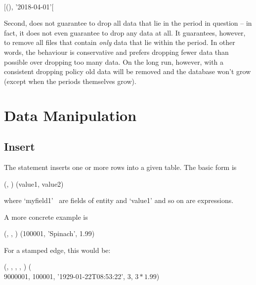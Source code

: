 \begin{minipage}{\textwidth}
  \\
$[$(), '2018-04-01'$[$
\end{minipage}

Second,  does not guarantee
to drop all data that lie in the period in question --
in fact, it does not even guarantee to drop any data at all.
It guarantees, however, to remove all files
that contain \emph{only} data that lie within the period.
In other words, the behaviour is conservative
and prefers dropping fewer data than possible over
dropping too many data.
On the long run, however, with a consistent dropping policy
old data will be removed and the database
won't grow (except when the periods themselves grow).

\section{Data Manipulation}
\subsection{Insert}
The  statement inserts one or more rows
into a given table.
The basic form is

  
                      (,
                       )
      (value1, value2)

where `myfield1' \etc\ are fields of entity 
and `value1' and so on are expressions.

A more concrete example is

  
                      (,
                       ,
                       )
      (100001, 'Spinach', 1.99)

For a stamped edge, this would be:

\begin{minipage}{\textwidth}
  
                      (,
                       ,
                       ,
                       ,
                       )
                      (\\
\hspace*{2.99cm}       9000001, 100001,
                       '1929-01-22T08:53:22',
                       3, $3\ast 1.99$)
\end{minipage}

